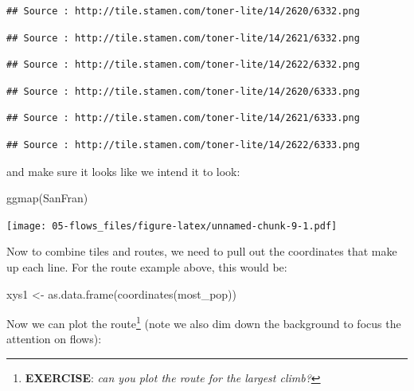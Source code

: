 \documentclass[
]{book}
\newenvironment{Shaded}{\begin{snugshade}}{\end{snugshade}}
\newcommand{\FunctionTok}[1]{\textcolor[rgb]{0.00,0.00,0.00}{#1}}
\newcommand{\NormalTok}[1]{#1}
\newcommand{\OtherTok}[1]{\textcolor[rgb]{0.56,0.35,0.01}{#1}}
\begin{document}
\begin{verbatim}
## Source : http://tile.stamen.com/toner-lite/14/2620/6332.png
\end{verbatim}

\begin{verbatim}
## Source : http://tile.stamen.com/toner-lite/14/2621/6332.png
\end{verbatim}

\begin{verbatim}
## Source : http://tile.stamen.com/toner-lite/14/2622/6332.png
\end{verbatim}

\begin{verbatim}
## Source : http://tile.stamen.com/toner-lite/14/2620/6333.png
\end{verbatim}

\begin{verbatim}
## Source : http://tile.stamen.com/toner-lite/14/2621/6333.png
\end{verbatim}

\begin{verbatim}
## Source : http://tile.stamen.com/toner-lite/14/2622/6333.png
\end{verbatim}

and make sure it looks like we intend it to look:

\begin{Shaded}
\begin{Highlighting}[]
\FunctionTok{ggmap}\NormalTok{(SanFran)}
\end{Highlighting}
\end{Shaded}

\texttt{[image: 05-flows\_files/figure-latex/unnamed-chunk-9-1.pdf]}

Now to combine tiles and routes, we need to pull out the coordinates that make up each line. For the route example above, this would be:

\begin{Shaded}
\begin{Highlighting}[]
\NormalTok{xys1 }\OtherTok{\textless{}{-}} \FunctionTok{as.data.frame}\NormalTok{(}\FunctionTok{coordinates}\NormalTok{(most\_pop))}
\end{Highlighting}
\end{Shaded}

Now we can plot the route\footnote{\textbf{EXERCISE}: \emph{can you plot the route for the largest climb?}} (note we also dim down the background to focus the attention on flows):
\end{document}
